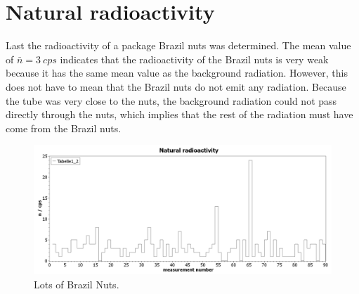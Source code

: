 \section{Natural radioactivity}
%
Last the radioactivity of a package Brazil nuts was determined. The mean value of \( \bar{n}=\SI{3}{cps} \) indicates that the radioactivity of the Brazil nuts is very weak because it
has the same mean value as the background radiation. However, this does not have to mean that the Brazil nuts do not emit
any radiation. Because the tube was very close to the nuts, the background radiation could not pass directly through the
nuts, which implies that the rest of the radiation must have come from the Brazil nuts.
\begin{figure}[H]
 \centering
 \includegraphics[width=.8\textwidth]{scidavis/Fig.12_Natural radioactivity.jpg}
 \caption[Brazil Nutz]{Lots of Brazil Nuts.}
 \label{fig:brazilNutz}
\end{figure}